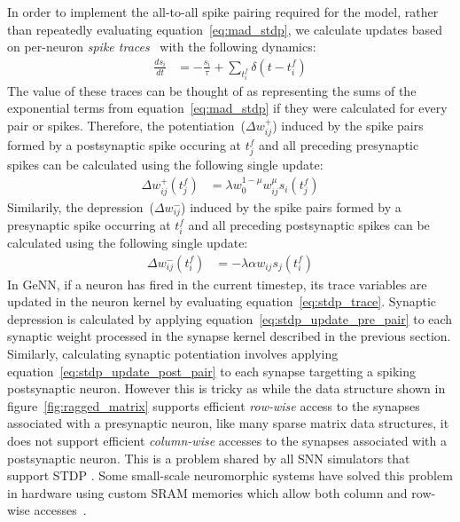 \documentclass[utf8]{frontiersSCNS} %
\begin{document}
In order to implement the all-to-all spike pairing required for the model, rather than repeatedly evaluating equation~\ref{eq:mad_stdp}, we calculate updates based on per-neuron \textit{spike traces}~\citep{Song2000, Morrison2007} with the following dynamics:
%
\begin{align}
    \frac{ds_{i}}{dt} & = -\frac{s_{i}}{\tau} + \sum_{t_{i}^{f}}\delta(t - t_{i}^{f}) \label{eq:stdp_trace}
\end{align}
%
The value of these traces can be thought of as representing the sums of the exponential terms from equation~\ref{eq:mad_stdp} if they were calculated for every pair or spikes.
Therefore, the potentiation~($\Delta w_{ij}^{+}$) induced by the spike pairs formed by a postsynaptic spike occuring at $t_{j}^{f}$ and all preceding presynaptic spikes can be calculated using the following single update:
%
\begin{align}
  \Delta w_{ij}^{+}(t_{j}^{f}) & = \lambda w_{0}^{1-\mu} w_{ij}^{\mu} s_{i}(t_{j}^{f})\label{eq:stdp_update_post_pair}
\end{align}
%
Similarily, the depression~($\Delta w_{ij}^{-}$) induced by the spike pairs formed by a presynaptic spike occurring at $t_{i}^{f}$ and all preceding postsynaptic spikes can be calculated using the following single update:
\begin{align}
    \Delta w_{ij}^{-}(t_{i}^{f}) & = -\lambda \alpha w_{ij} s_{j}(t_{i}^{f})\label{eq:stdp_update_pre_pair}
\end{align}
%
In GeNN, if a neuron has fired in the current timestep, its trace variables are updated in the neuron kernel by evaluating equation~\ref{eq:stdp_trace}.
Synaptic depression is calculated by applying equation~\ref{eq:stdp_update_pre_pair} to each synaptic weight processed in the synapse kernel described in the previous section.
Similarly, calculating synaptic potentiation involves applying equation~\ref{eq:stdp_update_post_pair} to each synapse targetting a spiking postsynaptic neuron.
However this is tricky as while the data structure shown in figure~\ref{fig:ragged_matrix} supports efficient \textit{row-wise} access to the synapses associated with a presynaptic neuron, like many sparse matrix data structures, it does not support efficient \textit{column-wise} accesses to the synapses associated with a postsynaptic neuron.
This is a problem shared by all SNN simulators that support STDP \citep{Brette2012}.
Some small-scale neuromorphic systems have solved this problem in hardware using custom SRAM memories which allow both column and row-wise accesses~\citep{Seo2011}.
\end{document}
